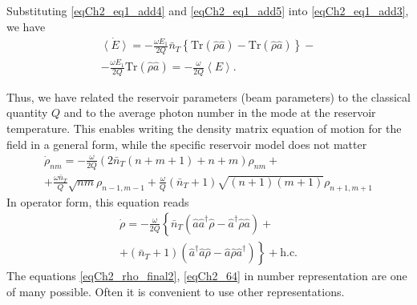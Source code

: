 Substituting \eqref{eqCh2_eq1_add4} and \eqref{eqCh2_eq1_add5} into 
\eqref{eqCh2_eq1_add3}, we have
\begin{eqnarray}
\dot{\left<E\right>} =
- \frac{\omega E_1}{2Q}\bar{n}_T
\left\{\mathrm{Tr}\left(\hat{\rho}\hat{a}\right) -
\mathrm{Tr}\left(\hat{\rho}\hat{a}\right)\right\} -
\nonumber \\
- \frac{\omega E_1}{2Q}
\mathrm{Tr}\left(\hat{\rho}\hat{a}\right) = 
- \frac{\omega}{2Q}\left<E\right>.
\label{eqCh2_61}
\end{eqnarray}

Thus, we have related the reservoir parameters (beam parameters) to the classical quantity $Q$ and to the average photon number in the mode 
at the reservoir temperature. This enables writing the density matrix equation of motion 
for the field in a general form, while the specific reservoir model does not matter 
\begin{eqnarray}
\dot{\rho}_{nm} = - \frac{\omega}{2 Q}
\left(2 \bar{n}_T\left( n + m + 1\right) + n + m \right)\rho_{nm} +
\nonumber \\
+ \frac{\omega \bar{n}_T}{Q}\sqrt{nm}\rho_{n - 1, m - 1} +
\frac{\omega}{Q}\left(\bar{n}_T + 1\right)
\sqrt{\left(n + 1\right)\left(m + 1\right)}
\rho_{n + 1, m + 1}
\label{eqCh2_63}
\end{eqnarray}
In operator form, this equation reads
\begin{eqnarray}
\dot{\rho} = - \frac{\omega}{2 Q}
\left\{
\bar{n}_T\left(\hat{a}\hat{a}^{\dag}\hat{\rho} - 
\hat{a}^{\dag}\hat{\rho}\hat{a}\right)
\right. +
\nonumber \\
+
\left .
\left(\bar{n}_T + 1\right)\left(\hat{a}^{\dag}\hat{a}\hat{\rho} - 
\hat{a}\hat{\rho}\hat{a}^{\dag}\right)
\right\} + \mathrm{h.c.}
\label{eqCh2_64}
\end{eqnarray}
The equations \eqref{eqCh2_rho_final2}, \eqref{eqCh2_64} in
number representation are one of many possible. Often it is convenient to use other representations.  

